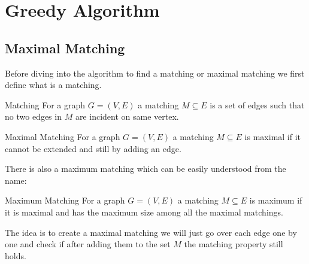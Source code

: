 \chapter{Greedy Algorithm}

\section{Maximal Matching}

\begin{algoprob}
\end{algoprob}
Before diving into the algorithm to find a matching or maximal matching we first define what is a matching.
\begin{Definition}{Matching}{}
	For a graph $G=(V,E)$ a matching $M\subseteq E$ is a set of edges such that no two edges in $M$ are incident on same vertex.
\end{Definition}
\begin{Definition}{Maximal Matching}{}
	For a graph $G=(V,E)$ a matching $M\subseteq E$ is maximal if it cannot be extended and still by adding an edge.
\end{Definition}
There is also a maximum matching which can be easily understood from the name:
\begin{Definition}{Maximum Matching}{}
	For a graph $G=(V,E)$ a matching $M\subseteq E$ is maximum if it is maximal and has the maximum size among all the maximal matchings.
\end{Definition}

\begin{idea*}
	The idea is to create a maximal matching we will just go over each edge one by one and check if after adding them to the set $M$  the matching property still holds. 
\end{idea*}
\begin{algorithm}
	\DontPrintSemicolon
\caption{}
\end{algorithm}


